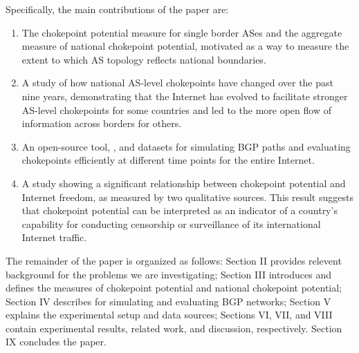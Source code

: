 






\par
Specifically, the main contributions of the paper are: 
\begin{enumerate}
 \item The chokepoint potential measure for single border ASes and the 
 aggregate measure of national chokepoint potential, motivated as a way to measure the extent to which AS topology reflects national boundaries.

 \item A study of how national AS-level chokepoints have changed over the past nine years, demonstrating that the Internet has evolved to facilitate stronger
 AS-level chokepoints for some countries and led to the more open flow of information across borders for others.
 \item An open-source tool, \toolname{}, and datasets for simulating BGP paths and evaluating chokepoints efficiently at different time points for the entire Internet.  
 \item A study showing a significant relationship between chokepoint potential and Internet freedom, as measured by two qualitative sources.  This result suggests that chokepoint potential can be interpreted as an indicator of a country's capability for conducting censorship or surveillance of its international Internet traffic.
\end{enumerate}


\par
The remainder of the paper is organized as follows: Section II provides relevent background for
the problems we are investigating; Section III introduces and defines the measures of chokepoint
potential and national chokepoint potential; Section IV describes \toolname{} for simulating and evaluating 
BGP networks; Section V
explains the experimental setup and data sources; Sections VI, VII, and VIII contain experimental results, related work, and discussion,
respectively.  Section IX concludes the paper.
